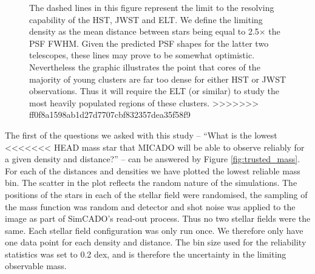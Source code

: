 \begin{figure}
{     The dashed lines in this figure represent the limit to the resolving
     capability of the HST, JWST and ELT. We define the limiting density as
     the mean distance between stars being equal to 2.5$\times$ the PSF FWHM.
     Given the predicted PSF shapes for the latter two telescopes, these lines
     may prove to be somewhat optimistic. Nevertheless the graphic
     illustrates the point that cores of the majority of young clusters are
     far too dense for either HST or JWST observations. Thus it will require
     the ELT (or similar) to study the most heavily populated regions of
     these clusters.}
>>>>>>> ff0f8a1598ab1d27d7707cbf832357dea35f58f9
    
    \label{fig:star_density_vs_age}
    
\end{figure}



The first of the questions we asked with this study -- ``What is the lowest
<<<<<<< HEAD
mass star that MICADO will be able to observe reliably for a given density
and  distance?'' -- can be answered by Figure \ref{fig:trusted_mass}. For
each  of the distances and densities we have plotted the lowest reliable mass
bin. The scatter in the plot reflects the random nature of the simulations.
The  positions of the stars in each of the stellar field were randomised, the
sampling of the mass function was random and detector and shot noise was
applied to the image as part of SimCADO's read-out process. Thus no two
stellar  fields were the same. Each stellar field configuration was only run
once. We therefore only have one data point for each density and distance.
The  bin size used for the reliability statistics was set to 0.2 dex, and is
therefore the uncertainty in the limiting observable mass.

